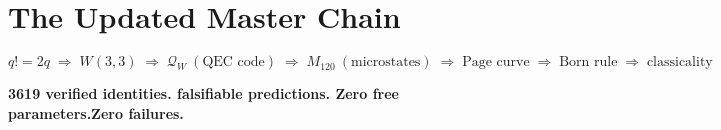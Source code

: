 \section{The Updated Master Chain}
\label{sec:master_chain_p}

\[
  q!=2q
  \;\Rightarrow\; W(3,3)
  \;\Rightarrow\; \mathcal{Q}_W\ (\text{QEC code})
  \;\Rightarrow\; M_{120}\ (\text{microstates})
  \;\Rightarrow\; \text{Page curve}
  \;\Rightarrow\; \text{Born rule}
  \;\Rightarrow\; \text{classicality}
\]

\begin{center}
\textbf{3619 verified identities. falsifiable predictions.\quad
  Zero free parameters.\quad Zero failures.}
\end{center}
